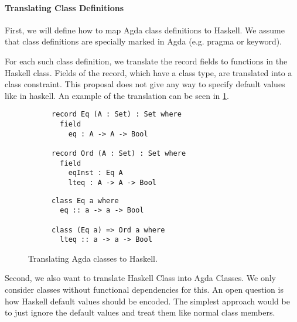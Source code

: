 \documentclass[12pt, a4paper, twoside]{report}
\begin{document}
\paragraph{Translating Class Definitions}
First, we will define how to map Agda class definitions to Haskell. We assume
that class definitions are specially marked in Agda (e.g. pragma or keyword).

For each such class definition, we translate the record fields to functions
in the Haskell class. Fields of the record, which have a class type, are
translated into a class constraint. This proposal does not give any way
to specify default values like in haskell. An example of the translation
can be seen in \ref{lst:cls-agda-hs}.
\begin{figure}
\begin{subfigure}[b]{0.5\textwidth}
\begin{lstlisting}
record Eq (A : Set) : Set where
  field
    eq : A -> A -> Bool

record Ord (A : Set) : Set where
  field
    eqInst : Eq A
    lteq : A -> A -> Bool
\end{lstlisting}
\end{subfigure}
\hspace{10pt}
\begin{subfigure}[b]{0.5\textwidth}
\begin{lstlisting}
class Eq a where
  eq :: a -> a -> Bool

class (Eq a) => Ord a where
  lteq :: a -> a -> Bool
\end{lstlisting}
\end{subfigure}
\caption{Translating Agda classes to Haskell.}
\label{lst:cls-agda-hs}
\end{figure}


Second, we also want to translate Haskell Class into Agda Classes. We only
consider classes without functional dependencies for this. An open question is
how Haskell default values should be encoded. The simplest approach would be
to just ignore the default values and treat them like normal class members.
\end{document}
